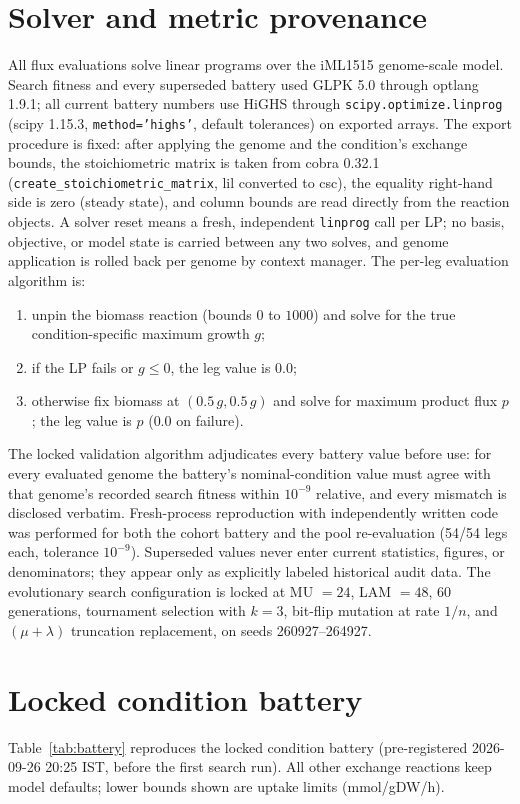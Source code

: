 \documentclass[12pt,a4paper]{article}
\begin{document}
\section{Solver and metric provenance}
All flux evaluations solve linear programs over the iML1515 genome-scale model. Search fitness and every superseded battery used GLPK 5.0 through optlang 1.9.1; all current battery numbers use HiGHS through \texttt{scipy.optimize.linprog} (scipy 1.15.3, \texttt{method='highs'}, default tolerances) on exported arrays. The export procedure is fixed: after applying the genome and the condition's exchange bounds, the stoichiometric matrix is taken from cobra 0.32.1 (\texttt{create\_stoichiometric\_matrix}, lil converted to csc), the equality right-hand side is zero (steady state), and column bounds are read directly from the reaction objects. A solver reset means a fresh, independent \texttt{linprog} call per LP; no basis, objective, or model state is carried between any two solves, and genome application is rolled back per genome by context manager. The per-leg evaluation algorithm is:
\begin{enumerate}
\item unpin the biomass reaction (bounds $0$ to $1000$) and solve for the true condition-specific maximum growth $g$;
\item if the LP fails or $g \le 0$, the leg value is $0.0$;
\item otherwise fix biomass at $(0.5\,g, 0.5\,g)$ and solve for maximum product flux $p$; the leg value is $p$ ($0.0$ on failure).
\end{enumerate}
The locked validation algorithm adjudicates every battery value before use: for every evaluated genome the battery's nominal-condition value must agree with that genome's recorded search fitness within $10^{-9}$ relative, and every mismatch is disclosed verbatim. Fresh-process reproduction with independently written code was performed for both the cohort battery and the pool re-evaluation (54/54 legs each, tolerance $10^{-9}$). Superseded values never enter current statistics, figures, or denominators; they appear only as explicitly labeled historical audit data. The evolutionary search configuration is locked at MU $=24$, LAM $=48$, 60 generations, tournament selection with $k=3$, bit-flip mutation at rate $1/n$, and $(\mu+\lambda)$ truncation replacement, on seeds 260927--264927.

\section{Locked condition battery}
Table~\ref{tab:battery} reproduces the locked condition battery (pre-registered 2026-09-26 20:25 IST, before the first search run). All other exchange reactions keep model defaults; lower bounds shown are uptake limits (mmol/gDW/h).
\end{document}
